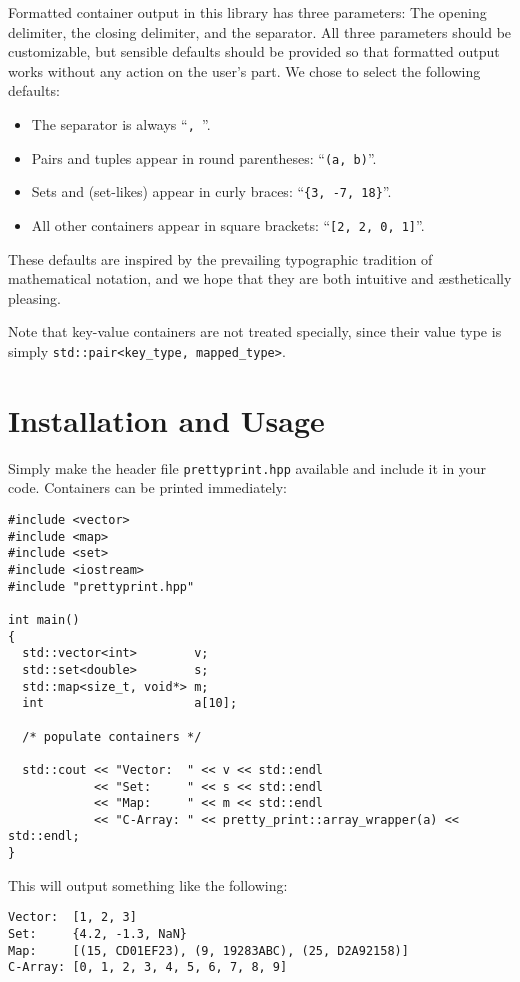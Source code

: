 \documentclass[a4paper,11pt]{article}
\begin{document}
Formatted container output in this library has three parameters: The
opening delimiter, the closing delimiter, and the separator. All three
parameters should be customizable, but sensible defaults should be
provided so that formatted output works without any action on the
user's part. We chose to select the following defaults:
\begin{itemize}
\item The separator is always ``\texttt{, }''.
\item Pairs and tuples appear in round parentheses: ``\texttt{(a, b)}''.
\item Sets and (set-likes) appear in curly braces: ``\texttt{\{3, -7, 18\}}''.
\item All other containers appear in square brackets: ``\texttt{[2, 2, 0, 1]}''.
\end{itemize}
These defaults are inspired by the prevailing typographic tradition
of mathematical notation, and we hope that they are both intuitive and
\ae{}sthetically pleasing.

Note that key-value containers are not treated specially, since their value
type is simply \texttt{std::pair<key\_type, mapped\_type>}.

\section*{Installation and Usage}

Simply make the header file \texttt{prettyprint.hpp} available and include
it in your code. Containers can be printed immediately:

\begin{verbatim}#include <vector>
#include <map>
#include <set>
#include <iostream>
#include "prettyprint.hpp"

int main()
{
  std::vector<int>        v;
  std::set<double>        s;
  std::map<size_t, void*> m;
  int                     a[10];

  /* populate containers */

  std::cout << "Vector:  " << v << std::endl
            << "Set:     " << s << std::endl
            << "Map:     " << m << std::endl
            << "C-Array: " << pretty_print::array_wrapper(a) << std::endl;
}
\end{verbatim}
This will output something like the following:
\begin{verbatim}Vector:  [1, 2, 3]
Set:     {4.2, -1.3, NaN}
Map:     [(15, CD01EF23), (9, 19283ABC), (25, D2A92158)]
C-Array: [0, 1, 2, 3, 4, 5, 6, 7, 8, 9]
\end{verbatim}
\end{document}
